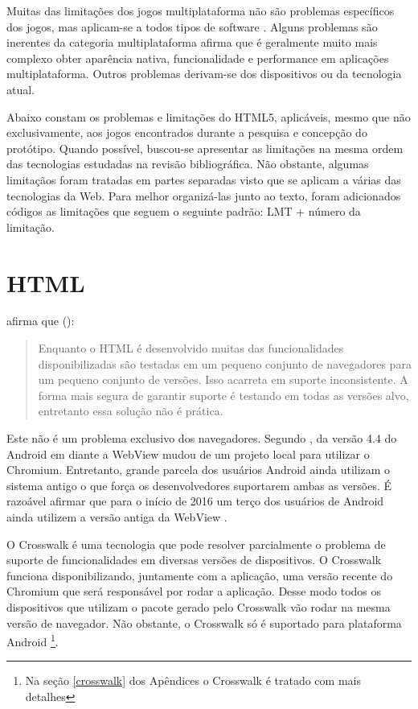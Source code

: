 
Muitas das limitações dos jogos multiplataforma não são
problemas específicos dos jogos, mas aplicam-se a todos tipos
de software \textsc{\autocite[p. 3]{currentStateCrossPlatform}}. Alguns
problemas são inerentes da categoria multiplataforma \citet[p.
7 ]{viabilityBusinessApplications} afirma que é geralmente muito
mais complexo obter aparência nativa, funcionalidade e performance
em aplicações multiplataforma. Outros problemas derivam-se dos
dispositivos ou da tecnologia atual.

Abaixo constam os problemas e limitações do HTML5, aplicáveis,
mesmo que não exclusivamente, aos jogos encontrados durante a pesquisa
e concepção do protótipo. Quando possível, buscou-se apresentar
as limitações na mesma ordem das tecnologias estudadas na revisão
bibliográfica. Não obstante, algumas limitaçãos foram tratadas em
partes separadas visto que se aplicam a várias das tecnologias da
Web. Para melhor organizá-las junto ao texto, foram adicionados
códigos as limitações que seguem o seguinte padrão: LMT + número da
limitação.

\section{HTML}

\noindent\citet{crossPlatformMobileGame} afirma que ():
\begin{quote}
Enquanto o HTML é desenvolvido muitas das funcionalidades
disponibilizadas são testadas em um pequeno conjunto de navegadores
para um pequeno conjunto de versões. Isso acarreta em suporte
inconsistente. A forma mais segura de garantir suporte é testando em
todas as versões alvo, entretanto essa solução não é prática.
\end{quote}

Este não é um problema exclusivo dos navegadores. Segundo
\citet{chromeWebView}, da versão 4.4 do Android em diante a WebView
mudou de um projeto local para utilizar o Chromium. Entretanto, grande
parcela dos usuários Android ainda utilizam o sistema antigo o que
força os desenvolvedores suportarem ambas as versões. É razoável
afirmar que para o início de 2016 um terço dos usuários de Android
ainda utilizem a versão antiga da WebView \textsc{\autocite{chromeWebView}}.

O Crosswalk é uma tecnologia que pode resolver parcialmente o problema
de suporte de funcionalidades em diversas versões de dispositivos.
O Crosswalk funciona disponibilizando, juntamente com a aplicação,
uma versão recente do Chromium que será responsável por rodar a
aplicação. Desse modo todos os dispositivos que utilizam o pacote
gerado pelo Crosswalk vão rodar na mesma versão de navegador. Não
obstante, o Crosswalk só é suportado para plataforma Android \footnote{Na
seção \ref{crosswalk} dos Apêndices o Crosswalk é tratado com mais
detalhes}.

